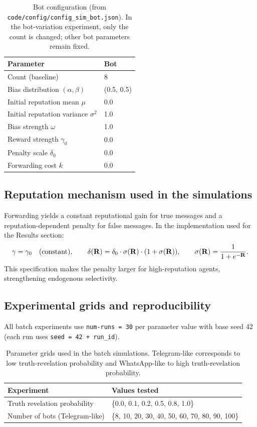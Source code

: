 \begin{table}[H]
\centering
\begin{tabular}{ll}
\hline
\textbf{Parameter} & \textbf{Bot} \\
\hline
Count (baseline) & 8 \\
Bias distribution $(\alpha,\beta)$ & (0.5, 0.5) \\
Initial reputation mean $\mu$ & 0.0 \\
Initial reputation variance $\sigma^2$ & 1.0 \\
Bias strength $\omega$ & 1.0 \\
Reward strength $\gamma_0$ & 0.0 \\
Penalty scale $\delta_0$ & 0.0 \\
Forwarding cost $k$ & 0.0 \\
\hline
\end{tabular}
\caption{Bot configuration (from \texttt{code/config/config\_sim\_bot.json}). In the bot-variation experiment, only the count is changed; other bot parameters remain fixed.}
\label{tab:bot_params}
\end{table}

\subsection{Reputation mechanism used in the simulations}

Forwarding yields a constant reputational gain for true messages and a reputation-dependent penalty for false messages. In the implementation used for the Results section:
\[
\gamma = \gamma_0 \quad\text{(constant)},
\qquad
\delta(\mathbf{R}) = \delta_0 \cdot \sigma(\mathbf{R})\cdot(1+\sigma(\mathbf{R})),
\qquad
\sigma(\mathbf{R})=\frac{1}{1+e^{-\mathbf{R}}}.
\]
This specification makes the penalty larger for high-reputation agents, strengthening endogenous selectivity.

\subsection{Experimental grids and reproducibility}

All batch experiments use \texttt{num-runs = 30} per parameter value with base seed 42 (each run uses \texttt{seed = 42 + run\_id}).

\begin{table}[H]
\centering
\begin{tabular}{ll}
\hline
\textbf{Experiment} & \textbf{Values tested} \\
\hline
Truth revelation probability & \{0.0, 0.1, 0.2, 0.5, 0.8, 1.0\} \\
Number of bots (Telegram-like) & \{8, 10, 20, 30, 40, 50, 60, 70, 80, 90, 100\} \\
\hline
\end{tabular}
\caption{Parameter grids used in the batch simulations. Telegram-like corresponds to low truth-revelation probability and WhatsApp-like to high truth-revelation probability.}
\label{tab:experiment_grids}
\end{table}




